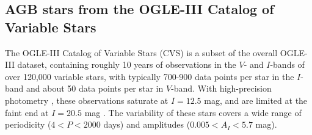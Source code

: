 
\subsection{AGB stars from the OGLE-III Catalog of Variable Stars}\label{sec:ogle}
The OGLE-III Catalog of Variable Stars (CVS) \citep{2008AcA....58...69U,2009AcA....59..239S,2011AcA....61..217S} is a subset of the overall OGLE-III dataset, containing roughly 10 years of observations in the $V$- and $I$-bands of over 120,000 variable stars, with typically 700-900 data points per star in the $I$-band and about 50 data points per star in $V$-band. With high-precision photometry \citep[$~0.01$ mag][]{2007AcA....57..201S}, these observations saturate at $I = 12.5$ mag, and are limited at the faint end at $I = 20.5$ mag \citep{2001AcA....51..303Z}. The variability of these stars covers a wide range of periodicity ($4 < P < 2000$ days) and amplitudes ($0.005 < A_I < 5.7$ mag).

